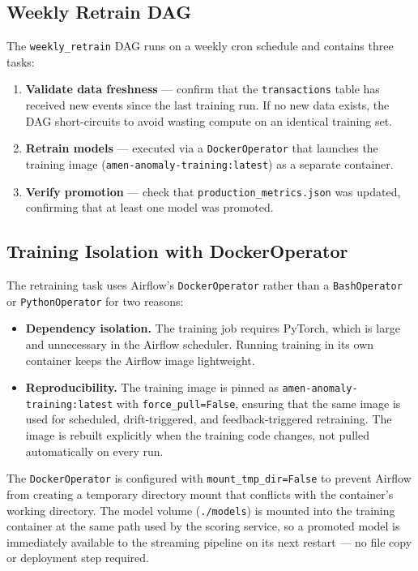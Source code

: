 \subsection{Weekly Retrain DAG}

The \texttt{weekly\_retrain} DAG runs on a weekly cron schedule and contains
three tasks:

\begin{enumerate}
    \item \textbf{Validate data freshness} --- confirm that the
          \texttt{transactions} table has received new events since the
          last training run. If no new data exists, the DAG short-circuits
          to avoid wasting compute on an identical training set.
    \item \textbf{Retrain models} --- executed via a
          \texttt{DockerOperator} that launches the training image
          (\texttt{amen-anomaly-training:latest}) as a separate container.
    \item \textbf{Verify promotion} --- check that
          \texttt{production\_metrics.json} was updated, confirming that
          at least one model was promoted.
\end{enumerate}

\subsection{Training Isolation with DockerOperator}

The retraining task uses Airflow's \texttt{DockerOperator} rather than a
\texttt{BashOperator} or \texttt{PythonOperator} for two reasons:

\begin{itemize}
    \item \textbf{Dependency isolation.} The training job requires PyTorch,
          which is large and unnecessary in the Airflow scheduler. Running
          training in its own container keeps the Airflow image lightweight.
    \item \textbf{Reproducibility.} The training image is pinned as
          \texttt{amen-anomaly-training:latest} with
          \texttt{force\_pull=False}, ensuring that the same image is used
          for scheduled, drift-triggered, and feedback-triggered retraining.
          The image is rebuilt explicitly when the training code changes,
          not pulled automatically on every run.
\end{itemize}

The \texttt{DockerOperator} is configured with
\texttt{mount\_tmp\_dir=False} to prevent Airflow from creating a temporary
directory mount that conflicts with the container's working directory. The
model volume (\texttt{./models}) is mounted into the training container at
the same path used by the scoring service, so a promoted model is
immediately available to the streaming pipeline on its next restart ---
no file copy or deployment step required.
